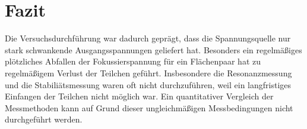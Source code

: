 \documentclass[a4paper,12pt]{article}
\begin{document}
\section{Fazit}
Die Versuchsdurchführung war dadurch geprägt, dass die Spannungsquelle nur stark schwankende Ausgangsspannungen geliefert hat. Besonders ein regelmäßiges plötzliches Abfallen der Fokussierspannung 
für ein Flächenpaar hat zu regelmäßigem Verlust der Teilchen geführt. Insbesondere die Resonanzmessung und die Stabiliätsmessung waren oft nicht durchzuführen, weil ein langfristiges Einfangen der Teilchen 
nicht möglich war. Ein quantitativer Vergleich der Messmethoden kann auf Grund dieser ungleichmäßigen Messbedingungen nicht durchgeführt werden. 


{}
\end{document}

